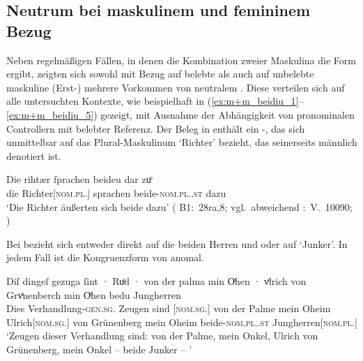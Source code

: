 
\subsection{Neutrum bei maskulinem und femininem Bezug}
\label{subsec:m+m_anim_beidiu}

Neben regelmäßigen Fällen, in denen die Kombination zweier Maskulina die Form
 ergibt, zeigten sich sowohl mit Bezug auf belebte als
auch auf unbelebte maskuline (Erst-) mehrere
Vorkommen von neutralem . Diese verteilen sich auf alle
untersuchten Kontexte, wie beispielhaft in
(\ref{ex:m+m_beidiu_1}--\ref{ex:m+m_beidiu_5}) gezeigt, mit
Ausnahme der Abhängigkeit von pronominalen
Controllern mit belebter Referenz. Der Beleg in
 enthält ein -, das sich
unmittelbar auf das Plural-Maskulinum  `Richter' bezieht, das
seinerseits männlich denotiert ist.

\begin{exe}
\ex \label{ex:m+m_beidiu_1}
	\gll Die rihtær ſprachen beideu {dar zuͦ} \\
		die Richter[\textsc{nom.pl.\MascM}] sprachen
		beide-\textsc{nom.pl.\NeutM.st} dazu \\
	\trans `Die Richter äußerten sich beide dazu'
		(%
			B1:~28ra,8; vgl.~abweichend
			\KC:~V.~10090;
			\cite[267]{schroeder1895}%
		)
\end{exe}

Bei  bezieht sich  entweder direkt auf die
beiden Herren  und 
oder auf  `Junker'. In jedem Fall ist die Kongruenzform von
 anomal.

\begin{exe}
\ex \label{ex:m+m_beidiu_3}
	\gll Diſ dingeſ gezuga ſint · Ruͦd · von der palma min Oͤhen · vͦlrich
			von Grvͤnenberch min Oͤhen bedu Jungherren \textelp{} \\
		Dies Verhandlung-\textsc{gen.sg.\NeutI} Zeugen sind {}
			[\textsc{nom.sg.\MascM}] {} von der Palme mein Oheim
			{} Ulrich[\textsc{nom.sg.\MascM}] von Grünenberg mein Oheim
			beide-\textsc{nom.pl.\NeutM.st}
			Jungherren[\textsc{nom.pl.\MascM}] {} \\
	\trans `Zeugen dieser Verhandlung sind:  von der Palme,
		mein Onkel, Ulrich von Grünenberg, mein Onkel -- beide Junker --
		\textelp{}'
		\parencites(Nr.~2915, Kl.~St.~Urban, Kt.~Luzern, 1298)[213,33--35]{cao4}
\end{exe}

